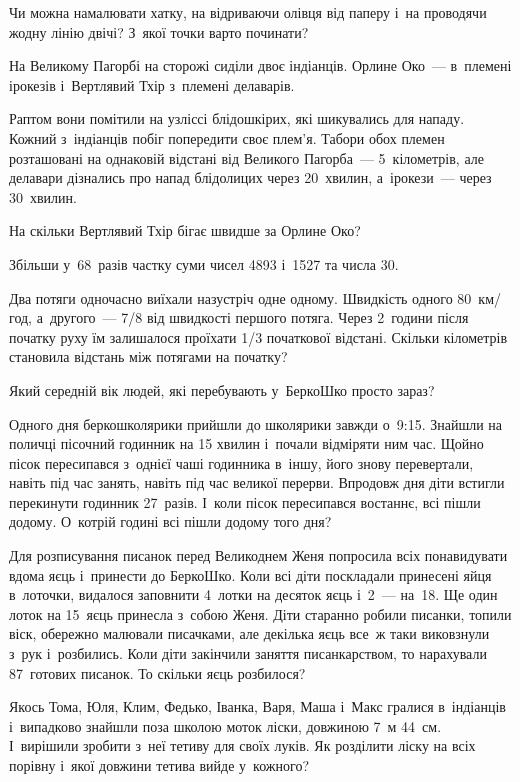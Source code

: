 \problem
Чи можна намалювати хатку, на відриваючи олівця від паперу і~на проводячи
жодну лінію двічі?
З~якої точки варто починати?


\problem
На Великому Пагорбі на сторожі сиділи двоє індіанців.
Орлине Око~--- в~племені ірокезів і~Вертлявий Тхір з~племені делаварів.

Раптом вони помітили на узліссі блідошкірих, які шикувались для нападу.
Кожний з~індіанців побіг попередити своє плем’я.
Табори обох племен розташовані на однаковій відстані від Великого Пагорба~---
5~кілометрів, але делавари дізнались про напад блідолицих через 20~хвилин,
а~ірокези~--- через 30~хвилин.

На скільки Вертлявий Тхір бігає швидше за Орлине Око?


\problem
Збільши у~68~разів частку суми чисел 4893 і~1527 та числа 30.


\problem
Два потяги одночасно виїхали назустріч одне одному.
Швидкість одного 80~км/год, а~другого~--- 7/8 від швидкості першого потяга.
Через 2~години після початку руху їм залишалося проїхати
1/3 початкової відстані.
Скільки кілометрів становила відстань між потягами на початку?


\problem
Який середній вік людей, які перебувають у~БеркоШко просто зараз?


\problem
Одного дня беркошколярики прийшли до школярики завжди о~9:15.
Знайшли на поличці пісочний годинник на 15 хвилин і~почали відміряти ним час.
Щойно пісок пересипався з~однієї чаші годинника в~іншу,
його знову перевертали, навіть під час занять,
навіть під час великої перерви.
Впродовж дня діти встигли перекинути годинник 27~разів.
І~коли пісок пересипався востаннє, всі пішли додому.
О~котрій годині всі пішли додому того дня?


\problem
Для розписування писанок перед Великоднем Женя попросила всіх понавидувати
вдома яєць і~принести до БеркоШко. Коли всі діти поскладали принесені яйця
в~лоточки, видалося заповнити 4~лотки на десяток яєць і~2~--- на~18.
Ще один лоток на 15~яєць принесла з~собою Женя.
Діти старанно робили писанки, топили віск, обережно малювали писачками,
але декілька яєць все~ж таки виковзнули з~рук і~розбились.
Коли діти закінчили заняття писанкарством, то нарахували 87~готових писанок.
То скільки яєць розбилося?


\problem
Якось Тома, Юля, Клим, Федько, Іванка, Варя, Маша і~Макс гралися
в~індіанців і~випадково знайшли поза школою моток ліски, довжиною 7~м 44~см.
І~вирішили зробити з~неї тетиву для своїх луків.
Як розділити ліску на всіх порівну і~якої довжини тетива вийде у~кожного?
